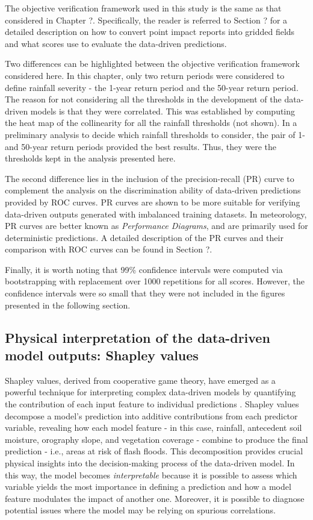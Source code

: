 \documentclass[nhess, manuscript]{copernicus}
\begin{document}
The objective verification framework used in this study is the same as that considered in Chapter ?. Specifically, the reader is referred to Section ? for a detailed description on how to convert point impact reports into gridded fields and what scores use to evaluate the data-driven predictions. 

Two differences can be highlighted between the objective verification framework considered here. In this chapter, only two return periods were considered to define rainfall severity - the 1-year return period and the 50-year return period. The reason for not considering all the thresholds in the development of the data-driven models is that they were correlated. This was established by computing the heat map of the collinearity for all the rainfall thresholds (not shown). In a preliminary analysis to decide which rainfall thresholds to consider, the pair of 1- and 50-year return periods provided the best results. Thus, they were the thresholds kept in the analysis presented here.

The second difference lies in the inclusion of the precision-recall (PR) curve to complement the analysis on the discrimination ability of data-driven predictions provided by ROC curves. PR curves are shown to be more suitable for verifying data-driven outputs generated with imbalanced training datasets. In meteorology, PR curves are better known as \textit{Performance Diagrams}, and are primarily used for deterministic predictions. A detailed description of the PR curves and their comparison with ROC curves can be found in Section ?.

Finally, it is worth noting that 99\% confidence intervals were computed via bootstrapping with replacement over 1000 repetitions for all scores. However, the confidence intervals were so small that they were not included in the figures presented in the following section.


\subsection{Physical interpretation of the data-driven model outputs: Shapley values}

Shapley values, derived from cooperative game theory, have emerged as a powerful technique for interpreting complex data-driven models by quantifying the contribution of each input feature to individual predictions \citep{Rozemberczki_2022}. Shapley values decompose a model's prediction into additive contributions from each predictor variable, revealing how each model feature - in this case, rainfall, antecedent soil moisture, orography slope, and vegetation coverage - combine to produce the final prediction - i.e., areas at risk of flash floods. This decomposition provides crucial physical insights into the decision-making process of the data-driven model. In this way, the model becomes \textit{interpretable} because it is possible to assess which variable yields the most importance in defining a prediction and how a model feature modulates the impact of another one. Moreover, it is possible to diagnose potential issues where the model may be relying on spurious correlations. 
\end{document}
